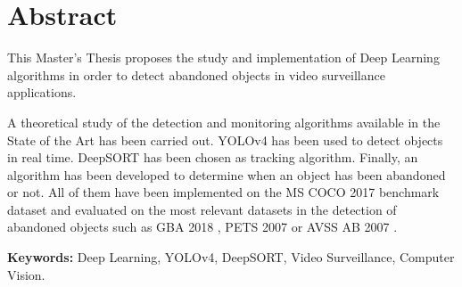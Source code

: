 
\chapter*{Abstract}
\label{cha:abstract}

\noindent
This Master's Thesis proposes the study and implementation of Deep Learning algorithms in order to detect abandoned objects in video surveillance applications.

A theoretical study of the detection and monitoring algorithms available in the State of the Art has been carried out. YOLOv4 \cite{bochkovskiy2020yolov4} has been used to detect objects in real time. DeepSORT \cite{Wojke2017simple} has been chosen as tracking algorithm. Finally, an algorithm has been developed to determine when an object has been abandoned or not. All of them have been implemented on the MS COCO 2017 \cite{lin2015microsoft} benchmark dataset and evaluated on the most relevant datasets in the detection of abandoned objects such as GBA 2018 \cite{gba-dataset}, PETS 2007 \cite{pets2007-dataset} or AVSS AB 2007 \cite{AVSSAB2007-dataset}.

\textbf{Keywords:} Deep Learning, YOLOv4, DeepSORT, Video Surveillance, Computer Vision.